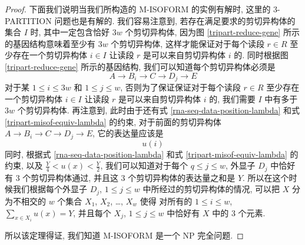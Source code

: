 \begin{proof}
下面我们说明当我们所构造的 M-ISOFORM 的实例有解时, 
这里的 3-PARTITION 问题也是有解的. 
我们容易注意到, 若存在满足要求的剪切异构体的集合 $I$ 时, 
其中一定包含恰好 $3w$ 个剪切异构体, 
因为图 \ref{tripart-reduce-gene} 所示的基因结构意味着至少有 $3w$ 个剪切异构体, 
这样才能保证对于每个读段 $r\in R$ 至少存在一个剪切异构体 $i\in I$ 
让读段 $r$ 是可以来自剪切异构体 $i$ 的. 
同时根据图 \ref{tripart-reduce-gene} 所示的基因结构, 
我们可以知道每个剪切异构体必须是
\[
A\to B_i \to C \to D_j \to E
\]
对于某 $1\leq i \leq 3w$ 和 $1 \leq j \leq w$, 
否则为了保证保证对于每个读段 $r\in R$ 至少存在一个剪切异构体 $i\in I$ 
让读段 $r$ 是可以来自剪切异构体 $i$ 的, 
我们需要 $I$ 中有多于 $3w$ 个剪切异构体. 
再注意到, 此时由于还有式 \eqref{rna-seq-data-position-lambda} 
和式 \eqref{tripart-misof-equiv-lambda} 的约束, 
对于前面的剪切异构体 $A\to B_i \to C \to D_j \to E$, 
它的表达量应该是
\[
u(i)
\]
同时, 根据式 \eqref{rna-seq-data-position-lambda} 
和式 \eqref{tripart-misof-equiv-lambda} 的约束, 
以及 $\frac{Y}{4} < u(x) < \frac{Y}{2}$, 
我们可以知道对于每个 $q\leq j\leq w$, 外显子 $D_j$ 中恰好有 3 个剪切异构体通过, 
并且这 3 个剪切异构体的表达量之和是 $Y$. 
所以在这个时候我们根据每个外显子 $D_j$, $1\leq j \leq w$ 中所经过的剪切异构体的情况, 
可以把 $X$ 分为不相交的 $w$ 个集合 $X_1$, $X_2$, \ldots, $X_w$ 使得 
对所有的 $1 \leq i \leq w$, $\sum_{x \in X_i} u(x) = Y$, 
并且每个 $X_j$, $1\leq j \leq w$ 中恰好有 $X$ 中的 3 个元素. 

所以该定理得证, 我们知道 M-ISOFORM 是一个 NP 完全问题. 

\end{proof}


